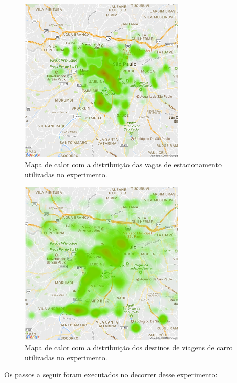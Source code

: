\begin{figure}[!ht]
    \centering
    \includegraphics[width=8cm]{figuras/mapa_vagas.pdf}
    \caption{Mapa de calor com a distribuição das vagas de estacionamento utilizadas no experimento.}
    \label{fig:map-spots-distribution}
\end{figure}

\begin{figure}[!ht]
    \centering
    \includegraphics[width=8cm]{figuras/mapa_viagens.pdf}
    \caption{Mapa de calor com a distribuição dos destinos de viagens de carro utilizadas no experimento.}
    \label{fig:map-destinations-distribution}
\end{figure}

Os passos a seguir foram executados no decorrer desse experimento:

